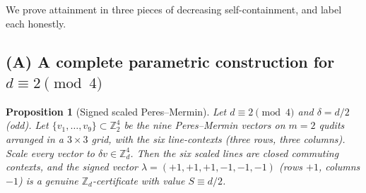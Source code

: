 \documentclass[11pt]{article}
\newtheorem{proposition}[theorem]{Proposition}
\theoremstyle{definition}
\theoremstyle{remark}
\newcommand{\Z}{\mathbb{Z}}
\newcommand{\Zd}{\Z_d}
\begin{document}
We prove attainment in three pieces of decreasing self-containment, and label each honestly.

\subsection*{(A) A complete parametric construction for $d\equiv2\pmod4$}

\begin{proposition}[Signed scaled Peres--Mermin]\label{prop:scaledPM}
Let $d\equiv2\pmod4$ and $\delta=d/2$ (odd). Let $\{v_1,\dots,v_9\}\subset\Z_2^4$ be the nine
Peres--Mermin vectors on $m=2$ qudits arranged in a $3\times3$ grid, with the six line-contexts
(three rows, three columns). Scale every vector to $\delta v\in\Zd^{4}$. Then the six scaled lines
are closed commuting contexts, and the signed vector $\lambda=(+1,+1,+1,-1,-1,-1)$ (rows $+1$,
columns $-1$) is a genuine $\Zd$-certificate with value $S\equiv d/2$.
\end{proposition}
\end{document}
